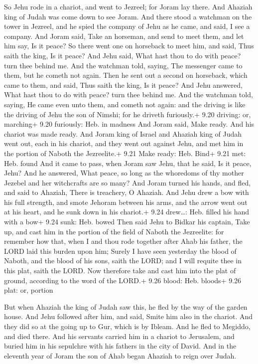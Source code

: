  So Jehu rode in a chariot, and went to Jezreel; for Joram
lay there. And Ahaziah king of Judah was come down to see Joram.
 And there stood a watchman on the tower in Jezreel, and he
spied the company of Jehu as he came, and said, I see a company. And
Joram said, Take an horseman, and send to meet them, and let him say, Is
it peace?  So there went one on horseback to meet him, and
said, Thus saith the king, Is it peace? And Jehu said, What hast thou to
do with peace? turn thee behind me. And the watchman told, saying, The
messenger came to them, but he cometh not again.  Then he
sent out a second on horseback, which came to them, and said, Thus saith
the king, Is it peace? And Jehu answered, What hast thou to do with
peace? turn thee behind me.  And the watchman told, saying,
He came even unto them, and cometh not again: and the driving is like
the driving of Jehu the son of Nimshi; for he driveth furiously.+ 9.20
driving: or, marching+ 9.20 furiously: Heb. in madness  And
Joram said, Make ready. And his chariot was made ready. And Joram king
of Israel and Ahaziah king of Judah went out, each in his chariot, and
they went out against Jehu, and met him in the portion of Naboth the
Jezreelite.+ 9.21 Make ready: Heb. Bind+ 9.21 met: Heb. found
 And it came to pass, when Joram saw Jehu, that he said, Is
it peace, Jehu? And he answered, What peace, so long as the whoredoms of
thy mother Jezebel and her witchcrafts are so many?  And
Joram turned his hands, and fled, and said to Ahaziah, There is
treachery, O Ahaziah.  And Jehu drew a bow with his full
strength, and smote Jehoram between his arms, and the arrow went out at
his heart, and he sunk down in his chariot.+ 9.24 drew\ldots: Heb.
filled his hand with a bow+ 9.24 sunk: Heb. bowed  Then
said Jehu to Bidkar his captain, Take up, and cast him in the portion of
the field of Naboth the Jezreelite: for remember how that, when I and
thou rode together after Ahab his father, the LORD laid this burden upon
him;  Surely I have seen yesterday the blood of Naboth, and
the blood of his sons, saith the LORD; and I will requite thee in this
plat, saith the LORD. Now therefore take and cast him into the plat of
ground, according to the word of the LORD.+ 9.26 blood: Heb. bloods+
9.26 plat: or, portion

 But when Ahaziah the king of Judah saw this, he fled by
the way of the garden house. And Jehu followed after him, and said,
Smite him also in the chariot. And they did so at the going up to Gur,
which is by Ibleam. And he fled to Megiddo, and died there.
 And his servants carried him in a chariot to Jerusalem,
and buried him in his sepulchre with his fathers in the city of David.
 And in the eleventh year of Joram the son of Ahab began
Ahaziah to reign over Judah.


